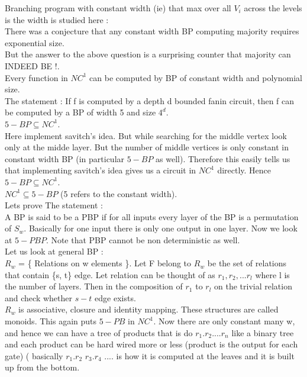 \documentclass[solution,addpoints,12pt]{exam}
\begin{document}
Branching program with constant width (ie) that max over all $V_i$ across
the levels is the width is studied here :\\
There was a conjecture that any constant width BP computing majority requires exponential
size.\\
But the answer to the above question is a surprising counter that majority can INDEED BE !.\\
Every function in ${NC}^1$ can be computed by BP of constant width and polynomial size.\\
The statement : If f is computed by a depth d bounded fanin circuit, then f can be computed
by a BP of width 5 and size $4^d$.\\
$5-BP \subseteq {NC}^1$.\\
Here implement savitch's idea. But while searching for the middle vertex
look only at the midde layer. But the number of middle vertices is only
constant in constant width BP (in particular $5-BP$ as well). Therefore
this easily tells us that implementing savitch's idea gives us a circuit in
${NC}^1$ directly. Hence $5-BP \subseteq {NC}^1$.\\

${NC}^1 \subseteq 5-BP$ (5 refers to the constant width).\\

Lets prove The statement :\\
A BP is said to be a PBP if for all inputs every layer of the BP is
a permutation of $S_w$. Basically for one input there is only one output in one layer.
Now we look at $5-PBP$. Note that PBP cannot be non deterministic as well.\\
Let us look at general BP :\\
$R_w$ = \{ Relations on w elements \}. Let F belong to $R_w$
be the set of relations that contain \{s, t\} edge.
Let relation can be thought of as
$r_1, r_2, ... r_l$ where l is the number of layers. Then in the composition
of $r_1$ to $r_l$ on the trivial relation and
check whether $s-t$ edge exists.\\
$R_w$ is associative, closure and identity mapping. These structures
are called monoids. This again puts $5-PB$ in ${NC}^1$. Now there
are only constant many w, and hence we can have a tree of products
that is do $r_1.r_2....r_n$ like a binary tree and each product can
be hard wired more or less (product is the output for each gate) (
basically $r_1.r_2$ $r_3.r_4$ .... is how it is computed at the
leaves and it is built up from the bottom.\\
\end{document}
